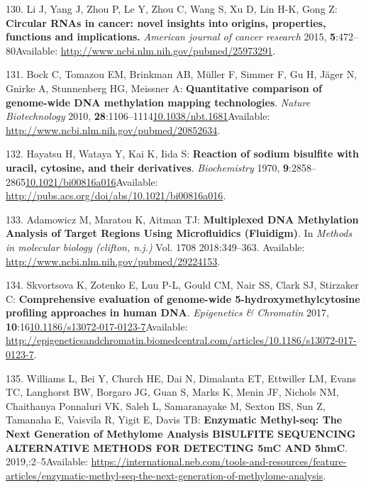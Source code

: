 \documentclass[
]{book}
\begin{document}
\leavevmode\hypertarget{ref-Li2015}{}%
130. Li J, Yang J, Zhou P, Le Y, Zhou C, Wang S, Xu D, Lin H-K, Gong Z: \textbf{Circular RNAs in cancer: novel insights into origins, properties, functions and implications.} \emph{American journal of cancer research} 2015, \textbf{5}:472--80Available: \url{http://www.ncbi.nlm.nih.gov/pubmed/25973291}.

\leavevmode\hypertarget{ref-Bock2010}{}%
131. Bock C, Tomazou EM, Brinkman AB, Müller F, Simmer F, Gu H, Jäger N, Gnirke A, Stunnenberg HG, Meissner A: \textbf{Quantitative comparison of genome-wide DNA methylation mapping technologies}. \emph{Nature Biotechnology} 2010, \textbf{28}:1106--1114\href{https://doi.org/10.1038/nbt.1681}{10.1038/nbt.1681}Available: \url{http://www.ncbi.nlm.nih.gov/pubmed/20852634}.

\leavevmode\hypertarget{ref-Hayatsu1970}{}%
132. Hayatsu H, Wataya Y, Kai K, Iida S: \textbf{Reaction of sodium bisulfite with uracil, cytosine, and their derivatives}. \emph{Biochemistry} 1970, \textbf{9}:2858--2865\href{https://doi.org/10.1021/bi00816a016}{10.1021/bi00816a016}Available: \url{http://pubs.acs.org/doi/abs/10.1021/bi00816a016}.

\leavevmode\hypertarget{ref-Adamowicz2018}{}%
133. Adamowicz M, Maratou K, Aitman TJ: \textbf{Multiplexed DNA Methylation Analysis of Target Regions Using Microfluidics (Fluidigm)}. In \emph{Methods in molecular biology (clifton, n.j.)} Vol. 1708 2018:349--363. Available: \url{http://www.ncbi.nlm.nih.gov/pubmed/29224153}.

\leavevmode\hypertarget{ref-Skvortsova2017}{}%
134. Skvortsova K, Zotenko E, Luu P-L, Gould CM, Nair SS, Clark SJ, Stirzaker C: \textbf{Comprehensive evaluation of genome-wide 5-hydroxymethylcytosine profiling approaches in human DNA}. \emph{Epigenetics \& Chromatin} 2017, \textbf{10}:16\href{https://doi.org/10.1186/s13072-017-0123-7}{10.1186/s13072-017-0123-7}Available: \url{http://epigeneticsandchromatin.biomedcentral.com/articles/10.1186/s13072-017-0123-7}.

\leavevmode\hypertarget{ref-Williams2019}{}%
135. Williams L, Bei Y, Church HE, Dai N, Dimalanta ET, Ettwiller LM, Evans TC, Langhorst BW, Borgaro JG, Guan S, Marks K, Menin JF, Nichols NM, Chaithanya Ponnaluri VK, Saleh L, Samaranayake M, Sexton BS, Sun Z, Tamanaha E, Vaisvila R, Yigit E, Davis TB: \textbf{Enzymatic Methyl-seq: The Next Generation of Methylome Analysis BISULFITE SEQUENCING ALTERNATIVE METHODS FOR DETECTING 5mC AND 5hmC}. 2019,:2--5Available: \url{https://international.neb.com/tools-and-resources/feature-articles/enzymatic-methyl-seq-the-next-generation-of-methylome-analysis}.
\end{document}
